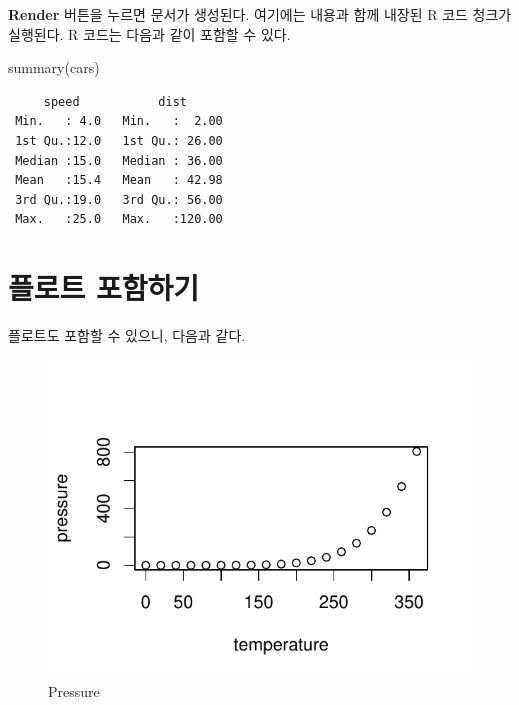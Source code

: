 \documentclass[
  chapter,a4paper,showtrims,openright,hidelinks]{oblivoir}
\newenvironment{Shaded}{\begin{snugshade}}{\end{snugshade}}
\newcommand{\FunctionTok}[1]{\textcolor[rgb]{0.28,0.35,0.67}{#1}}
\newcommand{\NormalTok}[1]{\textcolor[rgb]{0.00,0.23,0.31}{#1}}
\begin{document}
\textbf{Render} 버튼을 누르면 문서가 생성된다. 여기에는 내용과 함께
내장된 R 코드 청크가 실행된다. R 코드는 다음과 같이 포함할 수
있다.

\begin{Shaded}
\begin{Highlighting}[]
\FunctionTok{summary}\NormalTok{(cars)}
\end{Highlighting}
\end{Shaded}

\begin{verbatim}
     speed           dist       
 Min.   : 4.0   Min.   :  2.00  
 1st Qu.:12.0   1st Qu.: 26.00  
 Median :15.0   Median : 36.00  
 Mean   :15.4   Mean   : 42.98  
 3rd Qu.:19.0   3rd Qu.: 56.00  
 Max.   :25.0   Max.   :120.00  
\end{verbatim}

\hypertarget{uxd50cuxb85cuxd2b8-uxd3ecuxd568uxd558uxae30}{%
\section{플로트
포함하기}\label{uxd50cuxb85cuxd2b8-uxd3ecuxd568uxd558uxae30}}

플로트도 포함할 수 있으니, 다음과 같다.

\begin{figure}

{\centering \includegraphics{clt_files/figure-pdf/fig-test2-1.pdf}

}

\caption{\label{fig-test2}Pressure}

\end{figure}
\end{document}
